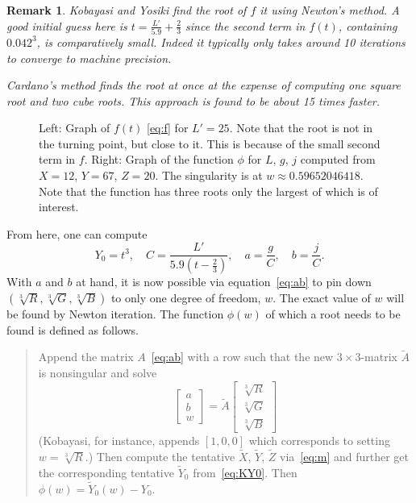 \documentclass{scrartcl}
\newtheorem*{remark}{Remark}
\theoremstyle{named}
\begin{document}
\begin{remark}
  Kobayasi and Yosiki find the root of $f$ it using Newton's method.  A good initial
  guess here is $t = \frac{L'}{5.9} + \frac{2}{3}$ since the second term in $f(t)$,
  containing $0.042^3$, is comparatively small. Indeed it typically only takes around 10
  iterations to converge to machine precision.

  Cardano's method finds the root at once at the expense of computing one square root
  and two cube roots. This approach is found to be about 15 times faster.
\end{remark}


\begin{figure}
  \centering
  \hfill
  
  \hfill
  
  \hfill
  \caption{Left: Graph of $f(t)$ \eqref{eq:f} for $L'=25$. Note that the root is not in
  the turning point, but close to it. This is because of the small second term in $f$.
  Right: Graph of the function $\phi$ for $L$, $g$, $j$ computed from $X=12$, $Y=67$,
  $Z=20$. The singularity is at $w\approx 0.59652046418$.  Note that the function has
  three roots only the largest of which is of interest.}\label{fig:singularity}
\end{figure}

From here, one can compute
\begin{equation}\label{eq:gather}
  Y_0 = t^3,\quad
  C = \frac{L'}{5.9 \left(t - \frac{2}{3}\right)},\quad
  a = \frac{g}{C},\quad
  b = \frac{j}{C}.
\end{equation}
With $a$ and $b$ at hand, it is now possible via equation~\eqref{eq:ab} to pin down
$(\sqrt[3]{R}, \sqrt[3]{G}, \sqrt[3]{B})$ to only one degree of freedom, $w$.
The exact value of $w$ will be found by Newton iteration. The function $\phi(w)$
of which a root needs to be found is defined as follows.
\begin{quotation}
  Append the matrix $A$~\eqref{eq:ab} with a row such that the new $3\times3$-matrix
  $\tilde{A}$ is nonsingular and solve
  \[
    \begin{bmatrix}
      a\\
      b\\
      w
    \end{bmatrix}
    =
    \tilde{A}
    \begin{bmatrix}
      \sqrt[3]{R}\\
      \sqrt[3]{G}\\
      \sqrt[3]{B}
    \end{bmatrix}
  \]
  (Kobayasi, for instance, appends $[1, 0, 0]$ which corresponds to setting
  $w=\sqrt[3]{R}$.) Then compute the tentative $\tilde{X}$, $\tilde{Y}$, $\tilde{Z}$
  via~\eqref{eq:m} and further get the corresponding tentative $\tilde{Y}_0$
  from~\eqref{eq:KY0}. Then $\phi(w) = \tilde{Y}_0(w) - Y_0$.
\end{quotation}
\end{document}
